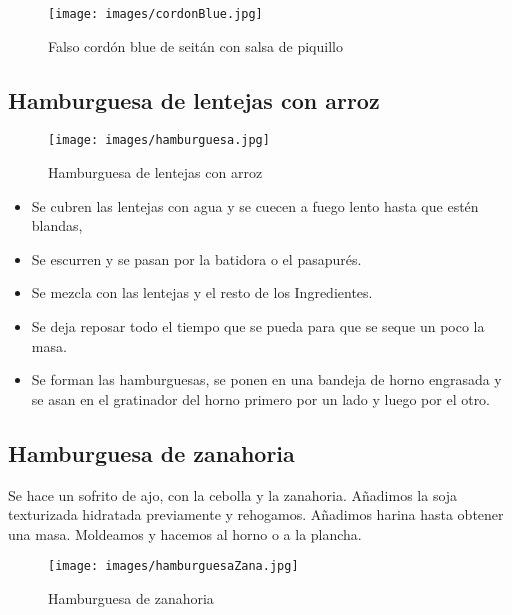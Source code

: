 \begin{figure}[h]
  \begin{center}
    \texttt{[image: images/cordonBlue.jpg]}
    \caption{Falso cordón blue de seitán con salsa de piquillo}
    \label{fig:cordonBlue}
  \end{center}
\end{figure}

\subsection{Hamburguesa de lentejas con arroz}
\label{sec:hamburguesa}

\begin{figure}[h]
  \begin{center}
    \texttt{[image: images/hamburguesa.jpg]}
    \caption{Hamburguesa de lentejas con arroz}
    \label{fig:hamburguesa}
  \end{center}
\end{figure}

\begin{itemize}
\item Se cubren las lentejas con agua y se cuecen a fuego lento hasta que estén blandas,
\item Se escurren y se pasan por la batidora o el pasapurés.
\item Se mezcla con las lentejas y el resto de los Ingredientes.
\item Se deja reposar todo el tiempo que se pueda para que se seque un poco la masa.
\item Se forman las hamburguesas, se ponen en una bandeja de horno engrasada y se asan en el gratinador del horno primero por un lado y luego por el otro.
\end{itemize}



\subsection{Hamburguesa de zanahoria}
\label{sec:hamburZana}

Se hace un sofrito de ajo, con la cebolla y la zanahoria. Añadimos la soja texturizada hidratada previamente y rehogamos. Añadimos harina hasta obtener una masa. Moldeamos y hacemos al horno o a la plancha. 

\begin{figure}[h]
  \begin{center}
    \texttt{[image: images/hamburguesaZana.jpg]}
    \caption{Hamburguesa de zanahoria}
    \label{fig:hamburguesaZana}
  \end{center}
\end{figure}

